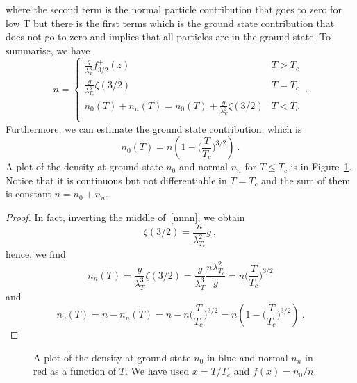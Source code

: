     where the second term is the normal particle contribution that goes to zero for low T but there is the first terms which is the ground state contribution that does not go to zero and implies that all particles are in the ground state. To summarise, we have 
    \begin{equation}\label{nnnn}
        n = \begin{cases}
            \frac{g}{\lambda_T^3} f^+_{3/2} (z) & T > T_c \\
            \frac{g}{\lambda_{T_c}^3} \zeta(3/2) & T = T_c \\
            n_0(T) + n_n(T) = n_0 (T) + \frac{g}{\lambda_{T}^3} \zeta(3/2) & T < T_c \\
        \end{cases} ~.
    \end{equation}
    Furthermore, we can estimate the ground state contribution, which is 
    \begin{equation*}
        n_0 (T) = n (1 - \Big (\frac{T}{T_c} \Big)^{3/2}) ~.
    \end{equation*} 
    A plot of the density at ground state $n_0$ and normal $n_n$ for $T \leq T_c$ is in Figure~\ref{fig:nn}. Notice that it is continuous but not differentiable in $T = T_c$ and the sum of them is constant $n = n_0 + n_n$.
    \begin{proof}
        In fact, inverting the middle of~\eqref{nnnn}, we obtain 
        \begin{equation*}
            \zeta(3/2) = \frac{n}{\lambda_{T_c}^2}{g} ~,
        \end{equation*}
        hence, we find 
        \begin{equation*}
            n_n (T) = \frac{g}{\lambda_T^3} \zeta(3/2) = \frac{g}{\lambda_T^3} \frac{n\lambda_{T_c}^2}{g} = n \Big (\frac{T}{T_c} \Big)^{3/2} 
        \end{equation*}
        and 
        \begin{equation*}
            n_0 (T) = n - n_n(T) = n - n \Big (\frac{T}{T_c} \Big)^{3/2} = n (1 - \Big (\frac{T}{T_c} \Big)^{3/2}) ~.
        \end{equation*}
    \end{proof}
    \begin{figure}
        \centering
        \caption{A plot of the density at ground state $n_0$ in blue and normal $n_n$ in red as a function of $T$. We have used $x = T / T_c$ and $f(x) = n_0 / n$.}
        \label{fig:nn}
    \end{figure}
